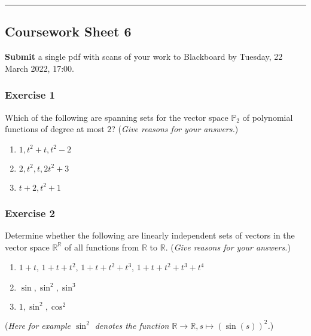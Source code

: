 \documentclass[
  12pt,
  a4paper,
  twoside]{article}
\theoremstyle{plain}
\theoremstyle{definition}
\begin{document}
\begin{center}\rule{0.5\linewidth}{0.5pt}\end{center}

\hypertarget{coursework-sheet-6}{%
\subsection{Coursework Sheet 6}\label{coursework-sheet-6}}

\textbf{Submit} a single pdf with scans of your work to Blackboard by Tuesday, 22 March 2022, 17:00.

\hypertarget{exercise-1-5}{%
\subsubsection*{Exercise 1}\label{exercise-1-5}}

Which of the following are spanning sets for the vector space
\(\mathbb{P}_2\) of polynomial functions of degree at most \(2\)? (\emph{Give
reasons for your answers.})

\begin{enumerate}
\def\labelenumi{(\alph{enumi})}
\item
  \(1, t^2+t, t^2-2\)
\item
  \(2, t^2, t, 2t^2 +3\)
\item
  \(t+2, t^2+1\)
\end{enumerate}

\hypertarget{exercise-2-5}{%
\subsubsection*{Exercise 2}\label{exercise-2-5}}

Determine whether the following are linearly independent sets of
vectors in the vector space \(\mathbb{R}^\mathbb{R}\) of all functions from \(\mathbb{R}\)
to \(\mathbb{R}\). (\emph{Give reasons for your answers.})

\begin{enumerate}
\def\labelenumi{(\alph{enumi})}
\item
  \(1+t\), \(1+t+t^2\), \(1+t+t^2+t^3\), \(1+t+t^2+t^3+t^4\)
\item
  \(\sin, \sin^2, \sin^3\)
\item
  \(1, \sin^2, \cos^2\)
\end{enumerate}

(\emph{Here for example \(\sin^2\) denotes the function \(\mathbb{R} \rightarrow \mathbb{R}, s \mapsto (\sin(s))^2\).})
\end{document}
